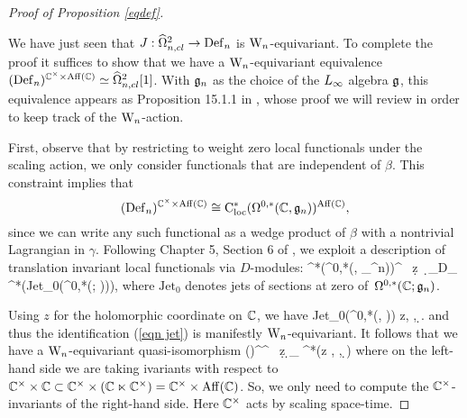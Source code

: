 \begin{proof}[Proof of Proposition \ref{eqdef}]
\label{seceqdef}

We have just seen that $J : \widehat{\Omega}^2_{n,cl} \to {\rm Def}_n$ is
${{\rm W}_n}$-equivariant. To complete the proof it suffices to show that we have a ${{\rm W}_n}$-equivariant equivalence $({\rm Def}_n)^{\mathbb C^\times \times {\rm
    Aff}(\mathbb C)} \simeq \widehat{\Omega}^2_{n,cl}[1]$. With $\mathfrak{g}_n$ as the choice of the $\L8$ algebra $\mathfrak g$, 
this equivalence appears as Proposition 15.1.1 in \cite{WG2},
whose proof we will review in order to keep track of the ${{\rm W}_n}$-action. 

First, observe that by restricting to weight zero local functionals under the scaling action,  
we only consider functionals that are independent of $\beta$. 
This constraint implies that 
\[
({\rm Def}_n)^{\mathbb C^\times \times {\rm Aff}(\mathbb C)} \cong {\rm C}^*_{\rm loc}(\Omega^{0,*}(\mathbb C, \mathfrak{g}_n))^{{\rm Aff}(\mathbb C)},
\] 
since we can write any such functional as a wedge product of $\beta$ with a nontrivial Lagrangian in $\gamma$.
Following Chapter 5, Section 6 of \cite{CosBook}, we exploit a
description of translation invariant local functionals via $D$-modules:
\be\label{eqn jet}
\Cloc^*\left(\Omega^{0,*}(\CC, \fg_{\hD^n})\right)^\CC 
\cong \CC \, \d z \, \d \zbar \otimes_{D_{\CC}} \Cred^*\left({\rm Jet}_0(\Omega^{0,*}(\CC ; \fgn))\right),
\ee
where $\text{Jet}_0$ denotes jets of sections at zero of~$\Omega^{0,*}(\mathbb C ; \mathfrak g_n)$. 

Using $z$ for the holomorphic coordinate on $\mathbb C$, we have
\ben
{\rm Jet}_0(\Omega^{0,*}(\CC, \fgn)) \cong \fgn \llbracket z, \zbar, \d \zbar \rrbracket.
\een 
and thus the identification (\ref{eqn jet}) is manifestly ${{\rm W}_n}$-equivariant. 
It follows that we have a ${{\rm W}_n}$-equivariant quasi-isomorphism
\ben
(\Def)^{\CC^\times \times \CC} \simeq \CC\, \d z \wedge \d \zbar \otimes_{} \Cred^*(\fgn\llbracket z , \zbar, \d \zbar \rrbracket)
\een
where on the left-hand side we are taking ivariants with respect to $\mathbb C^\times \times \mathbb C \subset \mathbb C^\times \times (\mathbb C \ltimes \mathbb C^\times) = \mathbb C^\times \times {\rm Aff}(\mathbb C)$. So, we only need to compute the $\mathbb C^\times$-invariants of the right-hand side. Here $\mathbb C^\times$ acts by scaling space-time.


\end{proof}
